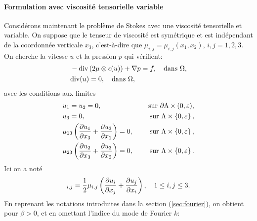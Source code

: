 %

\paragraph{Formulation avec viscosité tensorielle variable}
Considérons maintenant le problème de Stokes avec une viscosité
tensorielle et variable. On suppose que le tenseur de viscosité est
symétrique et est indépendant de la coordonnée verticale $x_3$,
c'est-à-dire que $\mu_{i,j} = \mu_{i,j}(x_1, x_2)$, $i,j = 1,2,3$. On
cherche la vitesse $u$ et la pression $p$ qui vérifient:
\begin{align}
  &-\div\parent{2\mu\otimes \epsilon(u)} + \nabla p = f, %
  \quad \text{dans } \Omega,\\
  &\div(u) = 0, %
  \quad \text{dans } \Omega,
\end{align}
avec les conditions aux limites
\begin{align}
  &u_1 = u_2 = 0, &\quad \text{ sur } \partial \Lambda \times
  (0,\varepsilon),\\
  &u_3 = 0, &\quad \text{ sur }  \Lambda \times \left\{ 0,\varepsilon \right\},\\
  &\mu_{13}\left( \frac{\partial u_1}{\partial x_3} + \frac{\partial u_3}{\partial
      x_1} \right) = 0, &\quad \text{ sur }  \Lambda \times \left\{ 0,\varepsilon \right\},\\
  &\mu_{23}\left( \frac{\partial u_2}{\partial x_3} + \frac{\partial u_3}{\partial
  x_2} \right) = 0, &\quad \text{ sur }  \Lambda \times \left\{ 0,\varepsilon \right\}.
\end{align}
Ici on a noté
\begin{equation}
  [\mu \otimes \straintensor(u)]_{i,j} %
  = \frac{1}{2}\mu_{i,j}\parent{\frac{\partial u_i}{\partial x_j} %
                              + \frac{\partial u_j}{\partial x_i}},%
  \quad 1\leq i,j\leq 3.
\end{equation}
En reprenant les notations introduites dans la section
(\ref{sec:fourier}), on obtient pour $\beta > 0$, et en omettant
l'indice du mode de Fourier $k$:
